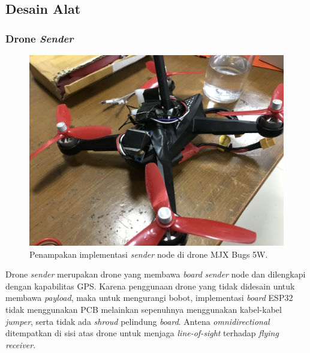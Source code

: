 \subsection{Desain Alat}
\subsubsection{Drone \textit{Sender}}
\begin{figure}[H]
	\centering
	\includegraphics[scale=0.075]{./assets/Pengujian/DroneSenderNew}
	\caption{Penampakan implementasi \textit{sender} node di drone MJX Bugs 5W.}
\end{figure}
Drone \textit{sender} merupakan drone yang membawa \textit{board} \textit{sender} node dan dilengkapi dengan kapabilitas GPS. Karena penggunaan drone yang tidak didesain untuk membawa \textit{payload}, maka untuk mengurangi bobot, implementasi \textit{board} ESP32 tidak menggunakan PCB melainkan sepenuhnya menggunakan kabel-kabel \textit{jumper}, serta tidak ada \textit{shroud} pelindung \textit{board}. Antena \textit{omnidirectional} ditempatkan di sisi atas drone untuk menjaga \textit{line-of-sight} terhadap \textit{flying receiver}.
